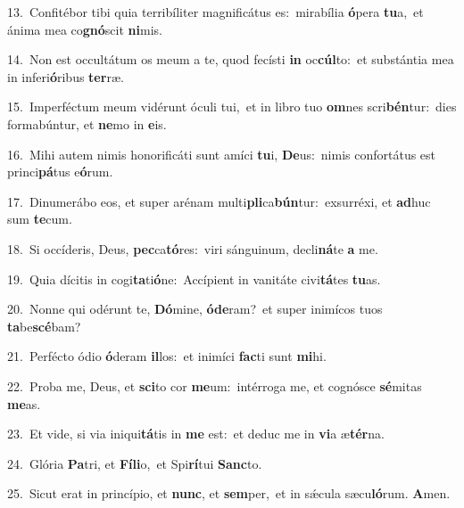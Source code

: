 {\numbfont\textcolor{\numbcolor}{13.}}~Confitébor tibi quia terribíliter magnificátus es:~\dagger mirabília \textbf{ó}\-pera \textbf{tu}\-a,~\star et ánima mea co\-\textbf{gnó}\-scit \textbf{ni}\-mis.\par
{\numbfont\textcolor{\numbcolor}{14.}}~Non est occultátum os meum a te, quod fecísti \textbf{in} oc\-\textbf{cúl}\-to:~\star et substántia mea in inferi\-\textbf{ó}\-ribus \textbf{ter}\-ræ.\par
{\numbfont\textcolor{\numbcolor}{15.}}~Imperféctum meum vidérunt óculi tui,~\dagger et in libro tuo \textbf{om}\-nes scri\-\textbf{bén}\-tur:~\star dies formabúntur, et \textbf{ne}\-mo in \textbf{e}\-is.\par
{\numbfont\textcolor{\numbcolor}{16.}}~Mihi autem nimis honorificáti sunt amíci \textbf{tu}\-i, \textbf{De}\-us:~\star nimis confortátus est princi\-\textbf{pá}\-tus e\-\textbf{ó}\-rum.\par
{\numbfont\textcolor{\numbcolor}{17.}}~Dinumerábo eos, et super arénam multi\-\textbf{pli}\-ca\-\textbf{bún}\-tur:~\star exsurréxi, et \textbf{ad}\-huc sum \textbf{te}\-cum.\par
{\numbfont\textcolor{\numbcolor}{18.}}~Si occíderis, Deus, \textbf{pec}\-ca\-\textbf{tó}\-res:~\star viri sánguinum, decli\-\textbf{ná}\-te \textbf{a} me.\par
{\numbfont\textcolor{\numbcolor}{19.}}~Quia dícitis in cogi\-\textbf{ta}\-ti\-\textbf{ó}\-ne:~\star Accípient in vanitáte civi\-\textbf{tá}\-tes \textbf{tu}\-as.\par
{\numbfont\textcolor{\numbcolor}{20.}}~Nonne qui odérunt te, \textbf{Dó}\-mine, \textbf{ó}\-\textbf{de}ram?~\star et super inimícos tuos \textbf{ta}\-be\-\textbf{scé}\-bam?\par
{\numbfont\textcolor{\numbcolor}{21.}}~Perfécto ódio \textbf{ó}\-deram \textbf{il}\-los:~\star et inimíci \textbf{fac}\-ti sunt \textbf{mi}\-hi.\par
{\numbfont\textcolor{\numbcolor}{22.}}~Proba me, Deus, et \textbf{sci}\-to cor \textbf{me}\-um:~\star intérroga me, et cognósce \textbf{sé}\-mitas \textbf{me}\-as.\par
{\numbfont\textcolor{\numbcolor}{23.}}~Et vide, si via iniqui\-\textbf{tá}\-tis in \textbf{me} est:~\star et deduc me in \textbf{vi}\-a æ\-\textbf{tér}\-na.\par
{\numbfont\textcolor{\numbcolor}{24.}}~Glória \textbf{Pa}\-tri, et \textbf{Fí}\-\textbf{li}o,~\star et Spi\-\textbf{rí}\-tui \textbf{Sanc}\-to.\par
{\numbfont\textcolor{\numbcolor}{25.}}~Sicut erat in princípio, et \textbf{nunc}\-, et \textbf{sem}\-per,~\star et in sǽcula sæcu\-\textbf{ló}\-rum. \textbf{A}\-men.\par
